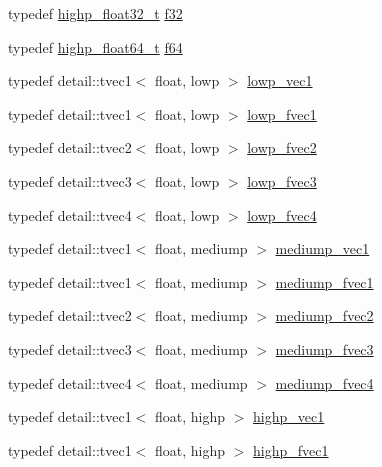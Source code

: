\begin{CompactItemize}
typedef \hyperlink{group__gtc__type__precision_g4e16a7818d09e2da3b81765999f23928}{highp\_\-float32\_\-t} \hyperlink{group__gtc__type__precision_g0ec999b57f5330d9021256e96038df04}{f32}
\item 
typedef \hyperlink{group__gtc__type__precision_ge8b3b2ace5be2a61c6bf63f12643fa15}{highp\_\-float64\_\-t} \hyperlink{group__gtc__type__precision_g2bba392e555124b36cde6abba349bab3}{f64}
\item 
typedef detail::tvec1$<$ float, lowp $>$ \hyperlink{group__gtc__type__precision_ge48c64f920be353ece773ff367f0161c}{lowp\_\-vec1}
\item 
typedef detail::tvec1$<$ float, lowp $>$ \hyperlink{group__gtc__type__precision_gd5266f0507395cf8cdfe84b9cf5496e4}{lowp\_\-fvec1}
\item 
typedef detail::tvec2$<$ float, lowp $>$ \hyperlink{group__gtc__type__precision_gf365442c52322b810bc0ed943e539229}{lowp\_\-fvec2}
\item 
typedef detail::tvec3$<$ float, lowp $>$ \hyperlink{group__gtc__type__precision_g83d77dfe136d4add9e214cd205320c12}{lowp\_\-fvec3}
\item 
typedef detail::tvec4$<$ float, lowp $>$ \hyperlink{group__gtc__type__precision_g0d016cdbff067c450122115d0620bf85}{lowp\_\-fvec4}
\item 
typedef detail::tvec1$<$ float, mediump $>$ \hyperlink{group__gtc__type__precision_g1b734d715033ab3026b2fb27e1fb7d3e}{mediump\_\-vec1}
\item 
typedef detail::tvec1$<$ float, mediump $>$ \hyperlink{group__gtc__type__precision_g4534af301d5260974cee29f76842d579}{mediump\_\-fvec1}
\item 
typedef detail::tvec2$<$ float, mediump $>$ \hyperlink{group__gtc__type__precision_g5c2686caa6838515f6727eea1b64aa05}{mediump\_\-fvec2}
\item 
typedef detail::tvec3$<$ float, mediump $>$ \hyperlink{group__gtc__type__precision_g710c3af5ebb05e5e863cff78affd25a6}{mediump\_\-fvec3}
\item 
typedef detail::tvec4$<$ float, mediump $>$ \hyperlink{group__gtc__type__precision_gba16de142de00531a1598d83716c6939}{mediump\_\-fvec4}
\item 
typedef detail::tvec1$<$ float, highp $>$ \hyperlink{group__gtc__type__precision_gb3f08c031846e7a95b49e81c48d920d3}{highp\_\-vec1}
\item 
typedef detail::tvec1$<$ float, highp $>$ \hyperlink{group__gtc__type__precision_g5d9f2208253856df60a57925f92ff0c8}{highp\_\-fvec1}
\item 

\end{CompactItemize}
